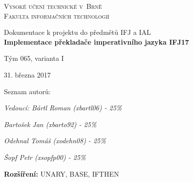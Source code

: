 \documentclass[11pt,a4paper]{article}
\begin{document}
    \begin{titlepage}
    \begin{center}
      {\Huge
      \textsc{Vysoké učení technické v~Brně} \\
      \medskip
		\huge{\textsc{Fakulta informačních technologií}}
       }\\
      \begin{figure}[h]
		\begin{center}
		\end{center}
	  \end{figure}
      {\LARGE
      Dokumentace k projektu do předmětů IFJ a IAL}\\
      \LARGE{\textbf{Implementace překladače imperativního jazyka IFJ17}}

      {\LARGE Tým 065, varianta I}

      {\LARGE 31. března 2017}

      {\LARGE Seznam autorů:\\}
      {\Large\itshape Vedoucí: Bártl Roman (xbartl06) - 25\%\par}
        {\Large\itshape Bartošek Jan (xbarto92) - 25\%\par}
        {\Large\itshape Odehnal Tomáš (xodehn08) - 25\%\par}
        {\Large\itshape Šopf Petr (xsopfp00) - 25\%\par}
        {\Large \textbf{Rozšíření:} UNARY, BASE, IFTHEN}
    \end{center}
\end{titlepage}

    \doublespacing
	\tableofcontents
	\singlespacing
    \newpage
\end{document}
